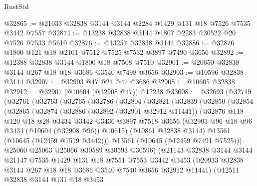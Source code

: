 \begin{lexlean}{RustStd}
\begin{coremodule}
@32865 := @21033 @32838 @3144 @3144 @2284 @1429 @131 @18 @7526 @7535 @3442 @7557
@32874 := @13238 @32838 @3144 @1807 @2283 @30522 @20 @7526 @7533 @5610
@32876 := @13257 @32838 @3144
@32886 := @32876 @1800 @121 @18 @2101 @7512 @7525 @7532 @3897 @7490 @3656
@32892 := @12388 @32838 @3144 @1800 @18 @7508 @7510
@32901 := @20650 @32838 @3144 @267 @18 @18 @3686 @3540 @7498 @3656
@32903 := @10596 @32838 @3144
@32907 := @32903 @47 @24 @47 @3686
@32908 := @10605 @32838
@32912 := @32907 (@10604 (@32908 @47)) @12238
@33008 := @32693
    (@32719
      (@32761
        (@32763
          (@32765
            (@32786
              (@32804
                (@32821
                  (@32839
                    (@32850
                      (@32854
                        (@32865
                          (@32874
                            (@32886
                              (@32892 (@32901 @32912 @11441))
                              (@32876
                                @118
                                @120
                                @18
                                @28
                                @3434
                                @3442
                                @3436
                                @3897
                                @7518
                                @3656
                                (@32903 @96 @18 @96 @3434 (@10604 (@32908 @96)) @10615)
                                (@10861 @32838 @3144)
                                @13561
                                (@10645 (@12459 @7519 @3442)))
                              @13561
                              (@10645 (@12459 @7491 @7525)))
                            @25060
                            @25063
                            @25066
                            @30589
                            @30593
                            @30596)
                          (@21143
                            @32838
                            @3144
                            @3144
                            @21147
                            @7535
                            @1429
                            @131
                            @18
                            @7551
                            @7553
                            @3442
                            @3453
                            (@20933 @32838 @3144 @267 @18 @18 @3686 @3540 @7540 @3656 @32912 @11441)
                            (@12511
                              @32838
                              @3144
                              @131
                              @18
                              @3453

\end{coremodule}
\end{lexlean}

